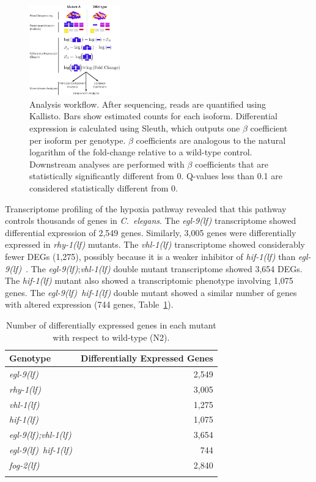 \documentclass[9pt,twocolumn,twoside]{pnas-new}
\newcommand{\cel}{\emph{C.~elegans}}
\newcommand{\gene}[1]{\mbox{\emph{#1}}}
\newcommand{\fog}{\gene{fog-2(lf)}}
\newcommand{\egl}{\gene{egl-9(lf)}}
\newcommand{\rhy}{\gene{rhy-1(lf)}}
\newcommand{\vhl}{\gene{vhl-1(lf)}}
\newcommand{\eglvhl}{\gene{egl-9(lf);vhl-1(lf)}}
\newcommand{\eglhif}{\gene{egl-9(lf) hif-1(lf)}}
\newcommand{\hif}{\gene{hif-1(lf)}}
\newcommand{\egln}{2,549}
\newcommand{\rhyn}{3,005}
\newcommand{\vhln}{1,275}
\newcommand{\eglvhln}{3,654}
\newcommand{\hifn}{1,075}
\newcommand{\eglhifn}{744}
\newcommand{\fogn}{2,840}
\begin{document}
\begin{figure}[tbhp]
  \centering
  \includegraphics[width=0.35\textwidth]{../figs/meaningofbeta.pdf}
  \caption{
    Analysis workflow. After sequencing, reads are quantified using Kallisto.
    Bars show estimated counts for each isoform. Differential expression is
    calculated using Sleuth, which outputs one $\beta$ coefficient per isoform
    per genotype. $\beta$ coefficients are analogous to the natural logarithm of
    the fold-change relative to a wild-type control. Downstream analyses are
    performed with $\beta$ coefficients that are statistically significantly
    different from 0. Q-values less than 0.1 are considered statistically
    different from 0.
  }
\label{fig:explain}
\end{figure}

Transcriptome profiling of the hypoxia pathway revealed that this pathway
controls thousands of genes in \cel{}. The \egl{} transcriptome showed
differential expression of \egln{} genes. Similarly, \rhyn{} genes were
differentially expressed in \rhy{} mutants. The \vhl{} transcriptome showed
considerably fewer DEGs (\vhln{}), possibly because it
is a weaker inhibitor of \hif{} than \egl{}~\cite{Shao2009}. The \egl{};\vhl{}
double mutant transcriptome showed \eglvhln{} DEGs.
The \hif{} mutant also showed a transcriptomic phenotype involving \hifn{}
genes. The \eglhif{} double mutant showed a similar number of genes with altered
expression (\eglhifn{} genes, Table~\ref{tab:genes}).


\begin{table}[tbhp]
  \centering
  \begin{tabular}{lr}
    \toprule{}
    Genotype & Differentially Expressed Genes\\
    \midrule{}\egl{} & \egln{}\\
    \rhy{} & \rhyn{}\\
    \vhl{} & \vhln{}\\
    \hif{} & \hifn{}\\
    \eglvhl{} & \eglvhln{}\\
    \eglhif{} & \eglhifn{}\\
    \fog{} & \fogn{}\\
    \bottomrule{}
  \end{tabular}
  \caption{Number of differentially expressed genes in each mutant with respect
  to wild-type (N2).}
\label{tab:genes}
\end{table}
\end{document}
